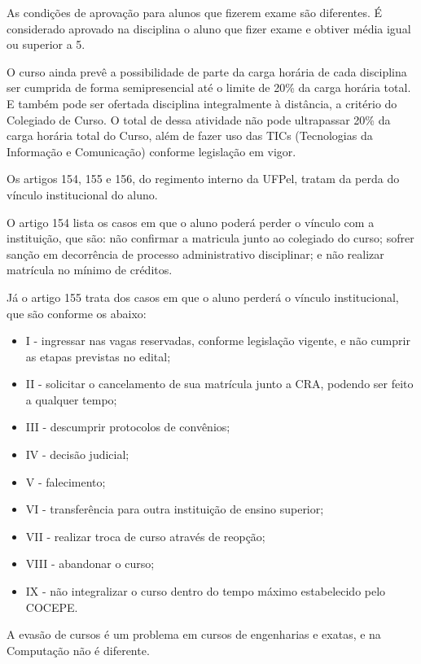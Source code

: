 \documentclass[diss,capa]{texufpel}
\begin{document}
As condições de aprovação para alunos que fizerem exame são diferentes.
É considerado aprovado na disciplina o aluno que fizer exame e obtiver média igual ou superior a 5.

O curso ainda prevê a possibilidade de parte da carga horária de cada disciplina ser cumprida de forma semipresencial até o limite de 20\% da carga horária total.
E também pode ser ofertada disciplina integralmente à distância, a critério do Colegiado de Curso.
O total de dessa atividade não pode ultrapassar 20\% da carga horária total do Curso, além de fazer uso das TICs (Tecnologias da Informação e Comunicação) conforme legislação em vigor.

Os artigos 154, 155 e 156, do regimento interno da UFPel, tratam da perda do vínculo institucional do aluno.

O artigo 154 lista os casos em que o aluno poderá perder o vínculo com a instituição, que são: não confirmar a matricula junto ao colegiado do curso; sofrer sanção em decorrência de processo administrativo disciplinar; e não realizar matrícula no mínimo de créditos.

Já o artigo 155 trata dos casos em que o aluno perderá o vínculo institucional, que são conforme os abaixo:

\begin{itemize}
\item I - ingressar nas vagas reservadas, conforme legislação vigente, e não cumprir as etapas previstas no edital;
\item II - solicitar o cancelamento de sua matrícula junto a CRA, podendo ser
feito a qualquer tempo;
\item III - descumprir protocolos de convênios;
\item IV - decisão judicial;
\item V - falecimento;
\item VI - transferência para outra instituição de ensino superior;
\item VII - realizar troca de curso através de reopção;
\item VIII - abandonar o curso;
\item IX - não integralizar o curso dentro do tempo máximo estabelecido pelo
COCEPE.
\end{itemize}

A evasão de cursos é um problema em cursos de engenharias e exatas, e na Computação não é diferente.
\end{document}
